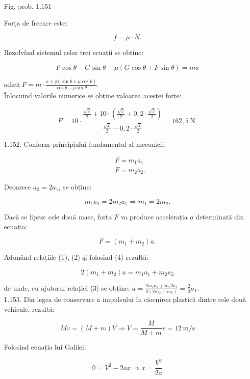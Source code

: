 \documentclass[10pt]{article}
\begin{document}
Fig. prob. 1.151

Forța de frecare este:

$$
f=\mu \cdot N .
$$

Rezolvând sistemul celor trei ecuații se obține:

$$
F \cos \theta-G \sin \theta-\mu(G \cos \theta+F \sin \theta)=m a
$$

adică $F=m \cdot \frac{a+g(\sin \theta+\mu \cos \theta)}{\cos \theta-\mu \sin \theta}$.\\
Înlocuind valorile numerice se obține valoarea acestei forțe:

$$
F=10 \cdot \frac{\frac{\sqrt{2}}{2}+10 \cdot\left(\frac{\sqrt{2}}{2}+0,2 \cdot \frac{\sqrt{2}}{2}\right)}{\frac{\sqrt{2}}{2}-0,2 \cdot \frac{\sqrt{2}}{2}}=162,5 \mathrm{~N} .
$$

1.152. Conform principiului fundamental al mecanicii:


\begin{align*}
& F=m_{1} a_{1}  \tag{1}\\
& F=m_{2} a_{2} . \tag{2}
\end{align*}


Deoarece $a_{2}=2 a_{1}$, se obține:


\begin{equation*}
m_{1} a_{1}=2 m_{2} a_{1} \Rightarrow m_{1}=2 m_{2} . \tag{3}
\end{equation*}


Dacă se lipesc cele două mase, forța $F$ va produce accelerația $a$ determinată din ecuația:


\begin{equation*}
F=\left(m_{1}+m_{2}\right) a . \tag{4}
\end{equation*}


Adunând relațiile (1), (2) şi folosind (4) rezultă:

$$
2\left(m_{1}+m_{2}\right) a=m_{1} a_{1}+m_{2} a_{2}
$$

de unde, cu ajutorul relației (3) se obține: $a=\frac{2 m_{2} a_{1}+m_{2} 2 a_{1}}{2\left(2 m_{2}+m_{2}\right)}=\frac{2}{3} a_{1}$.\\
1.153. Din legea de conservare a impulsului în ciocnirea plastică dintre cele două vehicule, rezultă:

$$
M v=(M+m) V \Rightarrow V=\frac{M}{M+m} v=12 \mathrm{~m} / \mathrm{s}
$$

Folosind ecuația lui Galilei:


\begin{equation*}
0=V^{2}-2 a x \Rightarrow x=\frac{V^{2}}{2 a} \tag{1}
\end{equation*}
\end{document}
